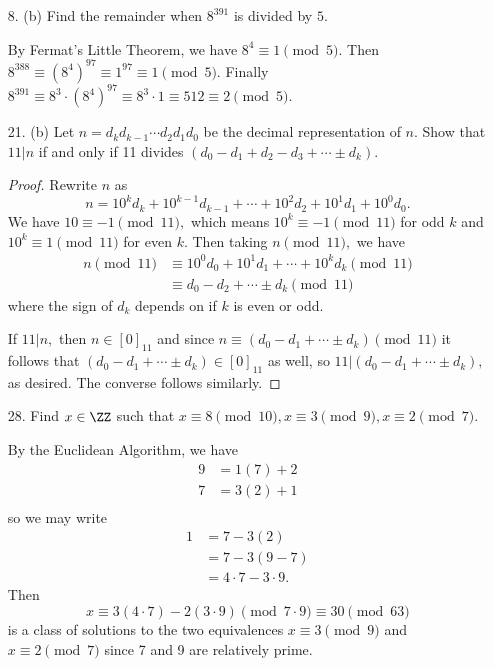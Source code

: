 \documentclass{article}
\begin{document}
\begin{itemize}
	\item[8.] (b) Find the remainder when $8^{391}$ is divided by $5.$
		\begin{soln}
			By Fermat's Little Theorem, we have $8^4\equiv1\pmod{5}.$ Then $8^{388}\equiv(8^4)^{97}\equiv1^{97}\equiv1\pmod{5}.$ Finally $8^{391}\equiv8^3\cdot(8^4)^{97}\equiv8^3\cdot1\equiv512\equiv\boxed{2\pmod{5}.}$
			
		\end{soln}

	
	\newpage
	
	\item[21.] (b) Let $n=d_kd_{k-1}\cdots d_2d_1d_0$ be the decimal representation of $n.$ Show that $11|n$ if and only if 11 divides $(d_0-d_1+d_2-d_3+\cdots\pm d_k).$
		\begin{proof}
			Rewrite $n$ as \[n = 10^kd_k + 10^{k-1}d_{k-1}+\cdots+10^2d_2+10^1d_1+10^0d_0.\] We have $10\equiv-1\pmod{11},$ which means $10^k\equiv-1\pmod{11}$ for odd $k$ and $10^k\equiv1\pmod{11}$ for even $k.$ Then taking $n\pmod{11},$ we have 
			\begin{align*}
				n\pmod{11} &\equiv 10^0d_0+10^1d_1+\cdots+10^kd_k\pmod{11} \\
				&\equiv d_0-d_2+\cdots\pm d_k\pmod{11}
			\end{align*} where the sign of $d_k$ depends on if $k$ is even or odd.

			If $11|n,$ then $n\in[0]_{11}$ and since $n\equiv (d_0-d_1+\cdots\pm d_k)\pmod{11}$ it follows that $(d_0-d_1+\cdots\pm d_k)\in[0]_{11}$ as well, so $11|(d_0-d_1+\cdots\pm d_k),$ as desired. The converse follows similarly.

		\end{proof}

	\item[28.] Find $x\in\ZZ$ such that $x\equiv8\pmod{10}, x\equiv3\pmod{9}, x\equiv2\pmod{7}.$
		\begin{soln}
			By the Euclidean Algorithm, we have 
			\begin{align*}
				9 &= 1(7) + 2 \\
				7 &= 3(2) + 1 \\
			\end{align*} so we may write 
			\begin{align*}
				1 &= 7 - 3(2) \\
				&= 7 - 3(9 - 7) \\
				&= 4\cdot7 - 3\cdot 9.
			\end{align*} Then \[x\equiv 3(4\cdot 7) - 2(3\cdot 9)\pmod{7\cdot9}\equiv30\pmod{63}\] is a class of solutions to the two equivalences $x\equiv3\pmod{9}$ and $x\equiv2\pmod{7}$ since 7 and 9 are relatively prime. 


\end{soln}
\end{itemize}
\end{document}
